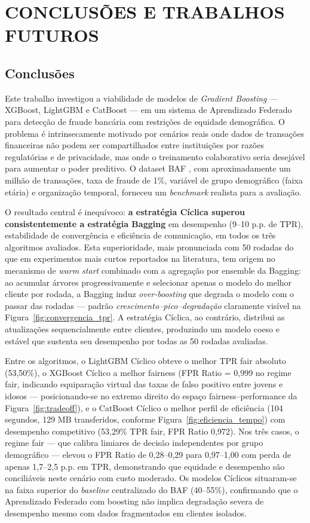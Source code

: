 \section{CONCLUSÕES E TRABALHOS FUTUROS}

\subsection{Conclusões}

Este trabalho investigou a viabilidade de modelos de \textit{Gradient Boosting} --- XGBoost, LightGBM e CatBoost --- em um sistema de Aprendizado Federado para detecção de fraude bancária com restrições de equidade demográfica. O problema é intrinsecamente motivado por cenários reais onde dados de transações financeiras não podem ser compartilhados entre instituições por razões regulatórias e de privacidade, mas onde o treinamento colaborativo seria desejável para aumentar o poder preditivo. O dataset BAF \cite{jesus2022baf}, com aproximadamente um milhão de transações, taxa de fraude de 1\%, variável de grupo demográfico (faixa etária) e organização temporal, forneceu um \textit{benchmark} realista para a avaliação.

O resultado central é inequívoco: \textbf{a estratégia Cíclica superou consistentemente a estratégia Bagging} em desempenho (9--10 p.p. de TPR), estabilidade de convergência e eficiência de comunicação, em todos os três algoritmos avaliados. Esta superioridade, mais pronunciada com 50 rodadas do que em experimentos mais curtos reportados na literatura, tem origem no mecanismo de \textit{warm start} combinado com a agregação por ensemble da Bagging: ao acumular árvores progressivamente e selecionar apenas o modelo do melhor cliente por rodada, a Bagging induz \textit{over-boosting} que degrada o modelo com o passar das rodadas --- padrão \textit{crescimento--pico--degradação} claramente visível na Figura~\ref{fig:convergencia_tpr}. A estratégia Cíclica, ao contrário, distribui as atualizações sequencialmente entre clientes, produzindo um modelo coeso e estável que sustenta seu desempenho por todas as 50 rodadas avaliadas.

Entre os algoritmos, o LightGBM Cíclico obteve o melhor TPR fair absoluto (53,50\%), o XGBoost Cíclico a melhor fairness (FPR Ratio = 0,999 no regime fair, indicando equiparação virtual das taxas de falso positivo entre jovens e idosos --- posicionando-se no extremo direito do espaço fairness--performance da Figura~\ref{fig:tradeoff}), e o CatBoost Cíclico o melhor perfil de eficiência (104 segundos, 129 MB transferidos, conforme Figura~\ref{fig:eficiencia_tempo}) com desempenho competitivo (53,29\% TPR fair, FPR Ratio 0,972). Nos três casos, o regime fair --- que calibra limiares de decisão independentes por grupo demográfico --- elevou o FPR Ratio de 0,28--0,29 para 0,97--1,00 com perda de apenas 1,7--2,5 p.p. em TPR, demonstrando que equidade e desempenho são conciliáveis neste cenário com custo moderado. Os modelos Cíclicos situaram-se na faixa superior do \textit{baseline} centralizado do BAF (40--55\%), confirmando que o Aprendizado Federado com boosting não implica degradação severa de desempenho mesmo com dados fragmentados em clientes isolados.

